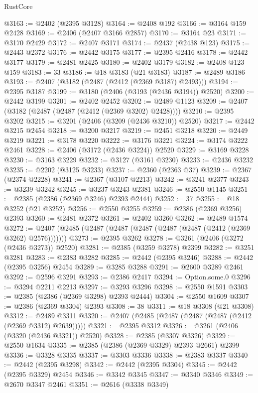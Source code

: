 \begin{lexlean}{RustCore}
\begin{coremodule}
@3163 := @2402 (@2395 @3128)
@3164 := @2408 @192
@3166 := @3164 @159 @2428
@3169 := @2406 (@2407 @3166 @2857)
@3170 := @3164 @23
@3171 := @3170 @2429
@3172 := @2407 @3171
@3174 := @2437 (@2438 @123)
@3175 := @2443 @2372
@3176 := @2442 @3175
@3177 := @2395 @2416
@3178 := @2442 @3177
@3179 := @2481 @2425
@3180 := @2402 @3179
@3182 := @2408 @123 @159
@3183 := 33
@3186 := @18 @3183 (@21 @3183)
@3187 := @2489 @3186
@3193 := @2407 (@3182 (@2487 (@2412 (@2369 @3187) @2493)))
@3194 := @2395 @3187
@3199 := @3180 (@2406 (@3193 (@2436 @3194)) @2520)
@3200 := @2442 @3199
@3201 := @2402 @2452
@3202 := @2489 @1123
@3209 := @2407 (@3182 (@2487 (@2487 (@2412 (@2369 @3202) @2428))))
@3210 := @2395 @3202
@3215 := @3201 (@2406 (@3209 (@2436 @3210)) @2520)
@3217 := @2442 @3215 @2454
@3218 := @3200 @3217
@3219 := @2451 @3218
@3220 := @2449 @3219
@3221 := @3178 @3220
@3222 := @3176 @3221
@3224 := @3174 @3222 @2461
@3228 := @2406 (@3172 (@2436 @3224)) @2520
@3229 := @3169 @3228
@3230 := @3163 @3229
@3232 := @3127 (@3161 @3230)
@3233 := @2436 @3232
@3235 := @2202 (@3125 @3233)
@3237 := @2360 (@2363 @37)
@3239 := @2367 (@2374 @2228)
@3241 := @2367 (@3107 @2213)
@3242 := @3241 @2377
@3243 := @3239 @3242
@3245 := @3237 @3243 @2381
@3246 := @2550 @1145
@3251 := @2385 (@2386 (@2369 @3246) @2393 @2444)
@3252 := 37
@3255 := @18 @3252 (@21 @3252)
@3256 := @2550 @3255
@3259 := @2386 (@2369 @3256) @2393
@3260 := @2481 @2372
@3261 := @2402 @3260
@3262 := @2489 @1574
@3272 := @2407 (@2485 (@2487 (@2487 (@2487 (@2487 (@2487 (@2412 (@2369 @3262) @2576)))))))
@3273 := @2395 @3262
@3278 := @3261 (@2406 (@3272 (@2436 @3273)) @2520)
@3281 := @2385 (@3259 @3278) @2399
@3282 := @3251 @3281
@3283 := @2383 @3282
@3285 := @2442 (@2395 @3246)
@3288 := @2442 (@2395 @3256) @2454
@3289 := @3285 @3288
@3291 := @2600 @3289 @2461
@3292 := @2596 @3291
@3293 := @2386 @2417
@3294 := Option.some.{0}
@3296 := @3294 @2211 @2213
@3297 := @3293 @3296
@3298 := @2550 @1591
@3303 := @2385 (@2386 (@2369 @3298) @2393 @2444)
@3304 := @2550 @1609
@3307 := @2386 (@2369 @3304) @2393
@3308 := 38
@3311 := @18 @3308 (@21 @3308)
@3312 := @2489 @3311
@3320 := @2407 (@2485 (@2487 (@2487 (@2487 (@2412 (@2369 @3312) @2639)))))
@3321 := @2395 @3312
@3326 := @3261 (@2406 (@3320 (@2436 @3321)) @2520)
@3328 := @2385 (@3307 @3326)
@3329 := @2550 @1634
@3335 := @2385 (@2386 (@2369 @3329) @2393 @2661) @2399
@3336 := @3328 @3335
@3337 := @3303 @3336
@3338 := @2383 @3337
@3340 := @2442 (@2395 @3298)
@3342 := @2442 (@2395 @3304)
@3345 := @2442 (@2395 @3329) @2454
@3346 := @3342 @3345
@3347 := @3340 @3346
@3349 := @2670 @3347 @2461
@3351 := @2616 (@3338 @3349)

\end{coremodule}
\end{lexlean}
